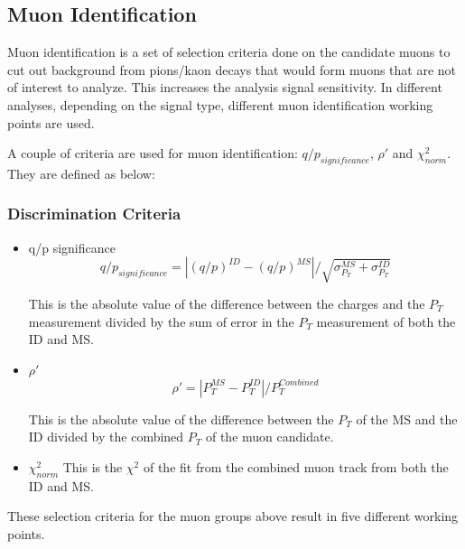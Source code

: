 \subsection{Muon Identification}
Muon identification is a set of selection criteria done on the candidate muons to cut out background from pions/kaon decays that would form muons that are not of interest to analyze. This increases the analysis signal sensitivity. In different analyses, depending on the signal type, different muon identification working points are used.

A couple of criteria are used for muon identification: $q/p_{significance}$, $\rho'$ and $\chi^{2}_{norm}$. They are defined as below:

\subsubsection*{Discrimination Criteria}
\begin{itemize}

\item q/p significance
    \begin{equation}
    q/p_{significance} = |(q/p)^{ID} - (q/p)^{MS}|/\sqrt{\sigma^{MS}_{P_{T}} + \sigma^{ID}_{P_{T}}}
    \end{equation}

This is the absolute value of the difference between the charges and the $P_{T}$ measurement divided by the sum of error in the $P_{T}$ measurement of both the ID and MS.

\item $\rho'$
    \begin{equation}
    \rho' = |P_{T}^{MS} - P_{T}^{ID}| / P_{T}^{Combined}
    \end{equation}

This is the absolute value of the difference between the $P_{T}$ of the MS and the ID divided by the combined $P_{T}$ of the muon candidate.

\item $\chi_{norm}^{2}$
    This is the $\chi^{2}$ of the fit from the combined muon track from both the ID and MS.

\end{itemize}

These selection criteria for the muon groups above result in five different working points.



